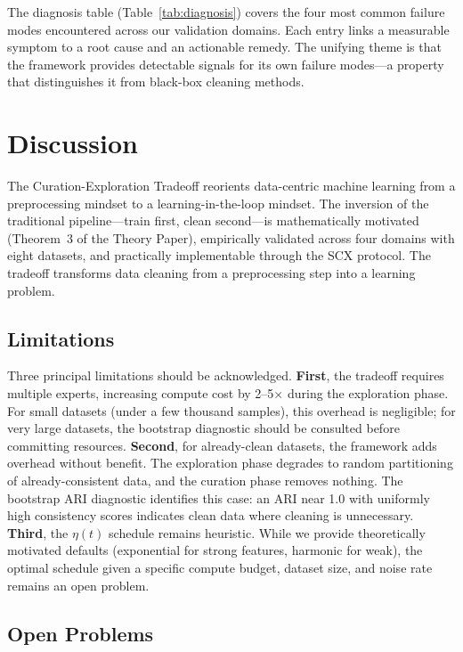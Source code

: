 \documentclass{article}
\begin{document}
The diagnosis table (Table~\ref{tab:diagnosis}) covers the four most common failure modes encountered across our validation domains. Each entry links a measurable symptom to a root cause and an actionable remedy. The unifying theme is that the framework provides detectable signals for its own failure modes---a property that distinguishes it from black-box cleaning methods.

\section{Discussion}
\label{sec:discussion}

The Curation-Exploration Tradeoff reorients data-centric machine learning from a preprocessing mindset to a learning-in-the-loop mindset. The inversion of the traditional pipeline---train first, clean second---is mathematically motivated (Theorem~3 of the Theory Paper), empirically validated across four domains with eight datasets, and practically implementable through the SCX protocol. The tradeoff transforms data cleaning from a preprocessing step into a learning problem.

\subsection{Limitations}

Three principal limitations should be acknowledged. \textbf{First}, the tradeoff requires multiple experts, increasing compute cost by 2--5$\times$ during the exploration phase. For small datasets (under a few thousand samples), this overhead is negligible; for very large datasets, the bootstrap diagnostic should be consulted before committing resources. \textbf{Second}, for already-clean datasets, the framework adds overhead without benefit. The exploration phase degrades to random partitioning of already-consistent data, and the curation phase removes nothing. The bootstrap ARI diagnostic identifies this case: an ARI near 1.0 with uniformly high consistency scores indicates clean data where cleaning is unnecessary. \textbf{Third}, the $\eta(t)$ schedule remains heuristic. While we provide theoretically motivated defaults (exponential for strong features, harmonic for weak), the optimal schedule given a specific compute budget, dataset size, and noise rate remains an open problem.

\subsection{Open Problems}
\end{document}
